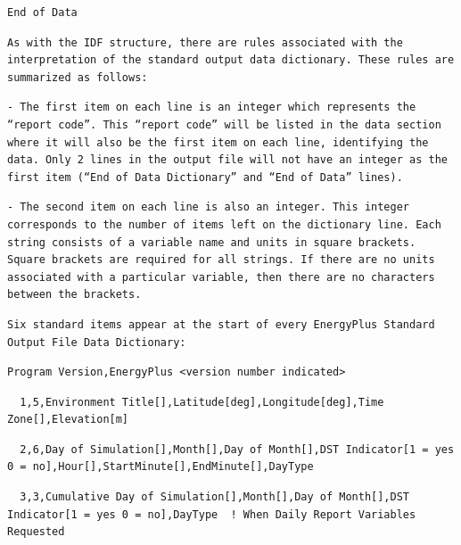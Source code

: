 \begin{lstlisting}
End of Data
\end{lstlisting}

\begin{lstlisting}
As with the IDF structure, there are rules associated with the interpretation of the standard output data dictionary. These rules are summarized as follows:
\end{lstlisting}

\begin{lstlisting}
- The first item on each line is an integer which represents the “report code”. This “report code” will be listed in the data section where it will also be the first item on each line, identifying the data. Only 2 lines in the output file will not have an integer as the first item (“End of Data Dictionary” and “End of Data” lines).
\end{lstlisting}

\begin{lstlisting}
- The second item on each line is also an integer. This integer corresponds to the number of items left on the dictionary line. Each string consists of a variable name and units in square brackets. Square brackets are required for all strings. If there are no units associated with a particular variable, then there are no characters between the brackets.
\end{lstlisting}

\begin{lstlisting}
Six standard items appear at the start of every EnergyPlus Standard Output File Data Dictionary:
\end{lstlisting}

\begin{lstlisting}
Program Version,EnergyPlus <version number indicated>
\end{lstlisting}

\begin{lstlisting}
  1,5,Environment Title[],Latitude[deg],Longitude[deg],Time Zone[],Elevation[m]
\end{lstlisting}

\begin{lstlisting}
  2,6,Day of Simulation[],Month[],Day of Month[],DST Indicator[1 = yes 0 = no],Hour[],StartMinute[],EndMinute[],DayType
\end{lstlisting}

\begin{lstlisting}
  3,3,Cumulative Day of Simulation[],Month[],Day of Month[],DST Indicator[1 = yes 0 = no],DayType  ! When Daily Report Variables Requested
\end{lstlisting}

